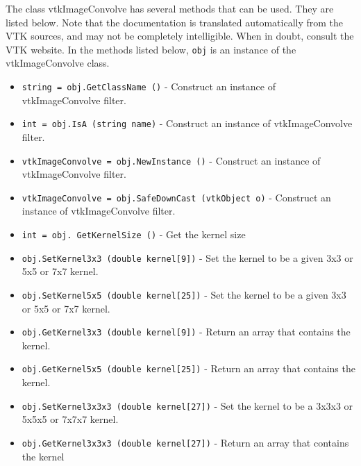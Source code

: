 The class vtkImageConvolve has several methods that can be used.
  They are listed below.
Note that the documentation is translated automatically from the VTK sources,
and may not be completely intelligible.  When in doubt, consult the VTK website.
In the methods listed below, \verb|obj| is an instance of the vtkImageConvolve class.
\begin{itemize}
\item  \verb|string = obj.GetClassName ()| -  Construct an instance of vtkImageConvolve filter.

\item  \verb|int = obj.IsA (string name)| -  Construct an instance of vtkImageConvolve filter.

\item  \verb|vtkImageConvolve = obj.NewInstance ()| -  Construct an instance of vtkImageConvolve filter.

\item  \verb|vtkImageConvolve = obj.SafeDownCast (vtkObject o)| -  Construct an instance of vtkImageConvolve filter.

\item  \verb|int = obj. GetKernelSize ()| -  Get the kernel size

\item  \verb|obj.SetKernel3x3 (double kernel[9])| -  Set the kernel to be a given 3x3 or 5x5 or 7x7 kernel.

\item  \verb|obj.SetKernel5x5 (double kernel[25])| -  Set the kernel to be a given 3x3 or 5x5 or 7x7 kernel.

\item  \verb|obj.GetKernel3x3 (double kernel[9])| -  Return an array that contains the kernel.

\item  \verb|obj.GetKernel5x5 (double kernel[25])| -  Return an array that contains the kernel.

\item  \verb|obj.SetKernel3x3x3 (double kernel[27])| -  Set the kernel to be a 3x3x3 or 5x5x5 or 7x7x7 kernel.

\item  \verb|obj.GetKernel3x3x3 (double kernel[27])| -  Return an array that contains the kernel

\end{itemize}
